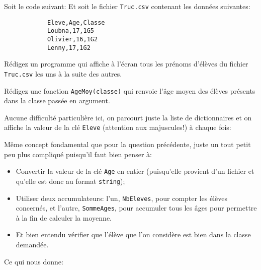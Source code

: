\documentclass[12pt]{article}
\begin{document}
	\begin{MonExo}
		Soit le code suivant:
		Et soit le fichier \texttt{Truc.csv} contenant les données suivantes:
		\begin{verbatim}
			Eleve,Age,Classe
			Loubna,17,1G5
			Olivier,16,1G2
			Lenny,17,1G2
		\end{verbatim}
		\begin{alphenum}
			\item Rédigez un programme qui affiche à l'écran tous les prénoms d'élèves du fichier \texttt{Truc.csv} les uns à la suite des autres.
			\item Rédigez une fonction \texttt{AgeMoy(classe)} qui renvoie l'âge moyen des élèves présents dans la classe passée en argument.
		\end{alphenum}
	\end{MonExo}
	\begin{MaReponse}
		\begin{alphenum}
			\item Aucune difficulté particulière ici, on parcourt juste la liste de dictionnaires et on affiche la valeur de la clé \texttt{Eleve} (attention aux majuscules!) à chaque fois:
			\item Même concept fondamental que pour la question précédente, juste un tout petit peu plus compliqué puisqu'il faut bien penser à:
			\begin{itemize}
				\item Convertir la valeur de la clé \texttt{Age} en entier (puisqu'elle provient d'un fichier et qu'elle est donc au format \texttt{string});
				\item Utiliser deux accumulateurs: l'un, \texttt{NbEleves}, pour compter les élèves concernés, et l'autre, \texttt{SommeAges}, pour accumuler tous les âges pour permettre à la fin de calculer la moyenne.
				\item Et bien entendu vérifier que l'élève que l'on considère est bien dans la classe demandée.
			\end{itemize}
			Ce qui nous donne:
		\end{alphenum}
	\end{MaReponse}
\end{document}
